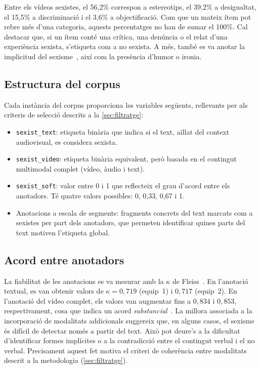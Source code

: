 Entre els vídeos sexistes, el 56,2\% correspon a estereotips, el 39,2\% a desigualtat, el 15,5\% a discriminació i el 3,6\% a objectificació.
Com que un mateix ítem pot rebre més d'una categoria, aquests percentatges no han de sumar el 100\%.
Cal destacar que, si un ítem conté una crítica, una denúncia o el relat d'una experiència sexista, s'etiqueta com a no sexista.
A més, també es va anotar la implicitud del sexisme~\cite{schmeisser2022criteria}, així com la presència d'humor o ironia.


\subsection{Estructura del corpus}

Cada instància del corpus proporciona les variables següents, rellevants per als criteris de selecció descrits a la \autoref{sec:filtratge}:
\begin{itemize}
    \item \texttt{sexist\_text}: etiqueta binària que indica si el text, aïllat del context audiovisual, es considera sexista.
    \item \texttt{sexist\_video}: etiqueta binària equivalent, però basada en el contingut multimodal complet (vídeo, àudio i text).
    \item \texttt{sexist\_soft}: valor entre 0 i 1 que reflecteix el grau d'acord entre els anotadors. Té quatre valors possibles: 0, 0,33, 0,67 i 1.
    \item Anotacions a escala de segments: fragments concrets del text marcats com a sexistes per part dels anotadors, que permeten identificar quines parts del text motiven l'etiqueta global.
\end{itemize}

\subsection{Acord entre anotadors}

La fiabilitat de les anotacions es va mesurar amb la $\kappa$ de Fleiss~\cite{fleiss1971measuring}.
En l'anotació textual, es van obtenir valors de $\kappa=0,719$ (equip~1) i $0,717$ (equip~2). En l'anotació del vídeo complet, els valors van augmentar fins a $0,834$ i $0,853$, respectivament, cosa que indica un acord \textit{substancial}~\cite{landis1977measurement}.
La millora associada a la incorporació de modalitats addicionals suggereix que, en alguns casos, el sexisme és difícil de detectar només a partir del text. Això pot deure's a la dificultat d'identificar formes implícites o a la contradicció entre el contingut verbal i el no verbal.
Precisament aquest fet motiva el criteri de coherència entre modalitats descrit a la metodologia (\autoref{sec:filtratge}).


